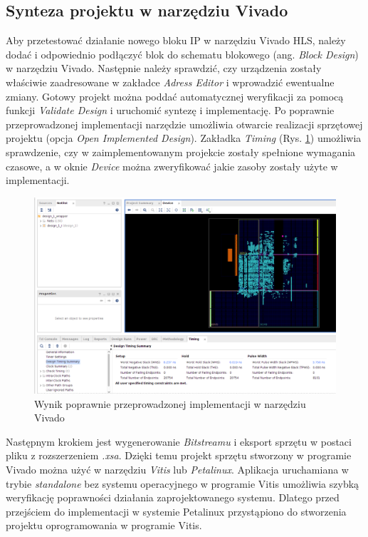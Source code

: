 \subsection{Synteza projektu w narzędziu Vivado}

Aby przetestować działanie nowego bloku IP w narzędziu Vivado HLS, należy dodać i odpowiednio podłączyć blok do 
schematu blokowego (ang. \emph{Block Design}) w narzędziu Vivado. Następnie należy sprawdzić, czy urządzenia zostały 
właściwie zaadresowane w zakładce \emph{Adress Editor} i wprowadzić ewentualne zmiany. Gotowy projekt można poddać 
automatycznej weryfikacji za pomocą funkcji \emph{Validate Design} i uruchomić syntezę i implementację. Po poprawnie 
przeprowadzonej implementacji narzędzie umożliwia otwarcie realizacji sprzętowej projektu (opcja \emph{Open Implemented 
Design}). Zakładka \emph{Timing} (Rys. \ref{impl_design_vivado}) umożliwia sprawdzenie, czy w zaimplementowanym 
projekcie zostały spełnione wymagania czasowe, a w oknie \emph{Device} można zweryfikować jakie zasoby zostały użyte w 
implementacji.

\begin{figure}
  \centering
  \includegraphics[width=\textwidth]{img/impl-design-vivado.png}
  \caption{Wynik poprawnie przeprowadzonej implementacji w narzędziu Vivado}
  \label{impl_design_vivado}
\end{figure}

Następnym krokiem jest wygenerowanie \emph{Bitstreamu} i eksport sprzętu w postaci pliku z rozszerzeniem \emph{.xsa}.
Dzięki temu projekt sprzętu stworzony w programie Vivado można użyć w narzędziu \emph{Vitis} 
lub \emph{Petalinux}. Aplikacja uruchamiana w trybie \emph{standalone} bez systemu operacyjnego w programie Vitis 
umożliwia szybką weryfikację poprawności działania zaprojektowanego systemu. Dlatego przed przejściem do implementacji 
w systemie Petalinux przystąpiono do stworzenia projektu oprogramowania w programie Vitis.


